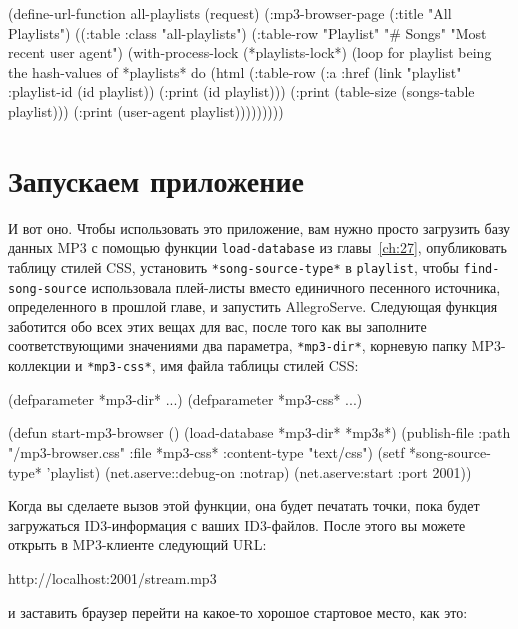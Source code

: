 \begin{myverb}
(define-url-function all-playlists (request)
  (:mp3-browser-page
   (:title "All Playlists")
   ((:table :class "all-playlists")
    (:table-row "Playlist" "# Songs" "Most recent user agent")
    (with-process-lock (*playlists-lock*)
      (loop for playlist being the hash-values of *playlists* do
           (html
             (:table-row
              (:a :href (link "playlist" :playlist-id (id playlist)) (:print (id playlist)))
              (:print (table-size (songs-table playlist)))
              (:print (user-agent playlist)))))))))
\end{myverb}

\section{Запускаем приложение}

И вот оно. Чтобы использовать это приложение, вам нужно просто загрузить базу данных MP3 с
помощью функции \lstinline{load-database} из главы~\ref{ch:27}, опубликовать таблицу
стилей CSS, установить \lstinline{*song-source-type*} в \lstinline{playlist}, чтобы
\lstinline{find-song-source} использовала плей-листы вместо единичного песенного источника,
определенного в прошлой главе, и запустить AllegroServe. Следующая функция заботится обо всех
этих вещах для вас, после того как вы заполните соответствующими значениями два
параметра, \lstinline{*mp3-dir*}, корневую папку MP3-коллекции и \lstinline{*mp3-css*}, имя файла
таблицы стилей CSS:

\begin{myverb}
(defparameter *mp3-dir* ...)
(defparameter *mp3-css* ...)

(defun start-mp3-browser ()
  (load-database *mp3-dir* *mp3s*)
  (publish-file :path "/mp3-browser.css"  :file *mp3-css* :content-type "text/css")
  (setf *song-source-type* 'playlist)
  (net.aserve::debug-on :notrap)
  (net.aserve:start :port 2001))
\end{myverb}

Когда вы сделаете вызов этой функции, она будет печатать точки, пока будет загружаться
ID3-информация с ваших ID3-файлов. После этого вы можете открыть в MP3-клиенте следующий
URL:

\begin{myverb}
  http://localhost:2001/stream.mp3
\end{myverb}

\noindent{}и заставить браузер перейти на какое-то хорошое стартовое место, как это:

